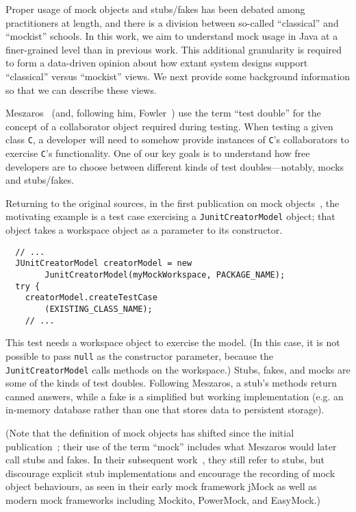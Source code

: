 Proper usage of mock objects and stubs/fakes has been debated among practitioners at length, and there is a division between so-called ``classical'' and ``mockist'' schools.
In this work, we aim to understand mock usage in Java at a finer-grained level than in previous work. This additional granularity is required to form a data-driven opinion about how extant system designs support ``classical'' versus ``mockist'' views. We next provide some background information so that we can describe these views.

Meszaros~\cite{meszaros2007xunit} (and, following him, Fowler~\cite{fowler07:_mocks_arent_stubs}) use the term ``test double'' for the concept of a collaborator object required during testing. When testing a given class \texttt{C}, a developer will need to somehow provide instances of \texttt{C}'s collaborators to exercise \texttt{C}'s functionality. 
One of our key goals is to understand how free developers are to choose between different kinds of test doubles---notably, mocks and stubs/fakes. 

Returning to the original sources, in the first publication on mock objects~\cite{mackinnon00:_endo_testin}, the motivating example is a test case exercising a \texttt{JunitCreatorModel} object; that object takes a workspace object as a parameter to its constructor.

\begin{lstlisting}
  // ...
  JUnitCreatorModel creatorModel = new
        JunitCreatorModel(myMockWorkspace, PACKAGE_NAME);
  try {
    creatorModel.createTestCase
        (EXISTING_CLASS_NAME);
    // ...
\end{lstlisting}

This test needs a workspace object to exercise the model. (In this case, it is not possible to pass \texttt{null} as the constructor parameter, because the \texttt{JunitCreatorModel} calls methods on the workspace.) Stubs, fakes, and mocks are some of the kinds of test doubles. Following Meszaros, a stub's methods return canned answers, while a fake is a simplified but working implementation (e.g. an in-memory database rather than one that stores data to persistent storage). 

(Note that the definition of mock objects has shifted since the initial publication~\cite{mackinnon00:_endo_testin}; their use of the term ``mock'' includes what Meszaros would later call stubs and fakes. In their subsequent work~\cite{freeman04:_mock_roles_objec}, they still refer to stubs, but discourage explicit stub implementations and encourage the recording of mock object behaviours, as seen in their early mock framework jMock as well as modern mock frameworks including Mockito, PowerMock, and EasyMock.)

